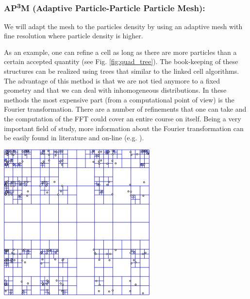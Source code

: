 \subsubsection*{AP\textsuperscript{3}M (Adaptive Particle-Particle Particle Mesh):}

We will adapt the mesh to the particles density by using an adaptive mesh with fine resolution where particle density is higher. 

\vspace{0.1cm}
\noindent
\begin{minipage}{\textwidth}
\begin{minipage}{.58\textwidth}
As an example, one can refine a cell as long as there are more particles than a certain accepted quantity (see Fig. \ref{fig:quad_tree}). The book-keeping of these structures can be realized using trees that similar to the linked cell algorithms. The advantage of this method is that we are not tied anymore to a fixed geometry and that we can deal with inhomogeneous distributions. In these methods the most expensive part (from a computational point of view) is the Fourier transformation. There are a number of refinements that one can take and the computation of the FFT could cover an entire course on itself. Being a very important field of study, more information about the Fourier transformation can be easily found in literature and on-line (e.g. \citet{fourier}).
 \end{minipage}\hfill
\begin{minipage}{.4\textwidth}
  \centering
  \includegraphics[width=\textwidth]{pics/quad_tree}
  \label{fig:quad_tree}
\end{minipage}
\end{minipage}

